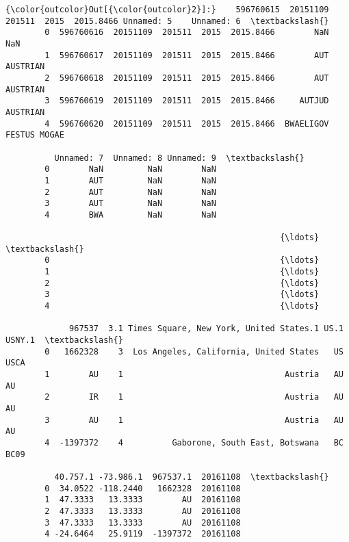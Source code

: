 \documentclass[11pt]{article}
\begin{document}
\begin{Verbatim}[commandchars=\\\{\}]
{\color{outcolor}Out[{\color{outcolor}2}]:}    596760615  20151109  201511  2015  2015.8466 Unnamed: 5    Unnamed: 6  \textbackslash{}
        0  596760616  20151109  201511  2015  2015.8466        NaN           NaN   
        1  596760617  20151109  201511  2015  2015.8466        AUT      AUSTRIAN   
        2  596760618  20151109  201511  2015  2015.8466        AUT      AUSTRIAN   
        3  596760619  20151109  201511  2015  2015.8466     AUTJUD      AUSTRIAN   
        4  596760620  20151109  201511  2015  2015.8466  BWAELIGOV  FESTUS MOGAE   
        
          Unnamed: 7  Unnamed: 8 Unnamed: 9  \textbackslash{}
        0        NaN         NaN        NaN   
        1        AUT         NaN        NaN   
        2        AUT         NaN        NaN   
        3        AUT         NaN        NaN   
        4        BWA         NaN        NaN   
        
                                                        {\ldots}                                                \textbackslash{}
        0                                               {\ldots}                                                 
        1                                               {\ldots}                                                 
        2                                               {\ldots}                                                 
        3                                               {\ldots}                                                 
        4                                               {\ldots}                                                 
        
             967537  3.1 Times Square, New York, United States.1 US.1  USNY.1  \textbackslash{}
        0   1662328    3  Los Angeles, California, United States   US    USCA   
        1        AU    1                                 Austria   AU      AU   
        2        IR    1                                 Austria   AU      AU   
        3        AU    1                                 Austria   AU      AU   
        4  -1397372    4          Gaborone, South East, Botswana   BC    BC09   
        
          40.757.1 -73.986.1  967537.1  20161108  \textbackslash{}
        0  34.0522 -118.2440   1662328  20161108   
        1  47.3333   13.3333        AU  20161108   
        2  47.3333   13.3333        AU  20161108   
        3  47.3333   13.3333        AU  20161108   
        4 -24.6464   25.9119  -1397372  20161108   
        

\end{Verbatim}
\end{document}
